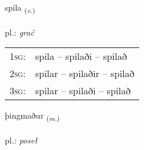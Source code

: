 \documentclass[frontgrid, backgrid]{flacards}\usepackage[]{graphicx}\usepackage[]{xcolor}
\begin{document}
\renewcommand{\flhead}{\vskip5pt \fboxsep=0pt {\small\bfseries\footnotesize Sagnorð | czasownik}}
\renewcommand{\fcfoot}{\vskip5pt \fboxsep=0pt \hspace{2pt}{\small\bfseries\footnotesize 1K}}

\renewcommand{\blhead}{\vskip5pt {\small\bfseries\footnotesize Sagnorð | czasownik }}
\renewcommand{\bcfoot}{\vskip5pt \hspace{2pt}{\small\bfseries\footnotesize 1K}}


{spila \small{\textsubscript{(\textit{v.})}} \\[1ex] %
\textphonetic{[spɪːla]} \\
pl.: \emph{grać} \\  [2ex]
\renewcommand*{\arraystretch}{0.8}
\begin{tabular}{p{1cm}l}
\textsc{1sg}: & spila -- spilaði -- spilað \\ 
\textsc{2sg}: & spilar -- spilaðir -- spilað \\ 
\textsc{3sg}: & spilar -- spilaði -- spilað \\ 
\end{tabular}
}

\renewcommand{\flhead}{\vskip5pt \fboxsep=0pt {\small\bfseries\footnotesize Nafnorð | rzeczownik}}
\renewcommand{\fcfoot}{\vskip5pt \fboxsep=0pt \hspace{2pt}{\small\bfseries\footnotesize 1K}}

\renewcommand{\blhead}{\vskip5pt {\small\bfseries\footnotesize Nafnorð | rzeczownik }}
\renewcommand{\bcfoot}{\vskip5pt \hspace{2pt}{\small\bfseries\footnotesize 1K}}


{þingmaður \small{\textsubscript{(\textit{m.})}} \\[1ex] %
\textphonetic{[θiŋkmaðʏr]} \\
pl.: \emph{poseł} \\  [2ex]
\renewcommand*{\arraystretch}{0.8}
}
\end{document}
